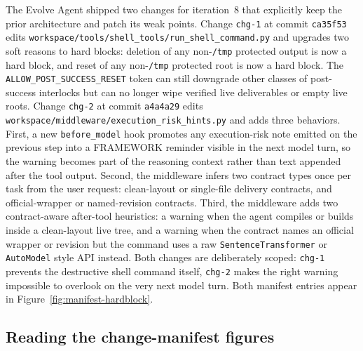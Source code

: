 The Evolve Agent shipped two changes for iteration~8 that explicitly keep the prior architecture and patch its weak points. Change \texttt{chg-1} at commit \texttt{ca35f53} edits \texttt{workspace/tools/shell\_tools/run\_shell\_command.py} and upgrades two soft reasons to hard blocks: deletion of any non-\texttt{/tmp} protected output is now a hard block, and reset of any non-\texttt{/tmp} protected root is now a hard block. The \texttt{ALLOW\_POST\_SUCCESS\_RESET} token can still downgrade other classes of post-success interlocks but can no longer wipe verified live deliverables or empty live roots. Change \texttt{chg-2} at commit \texttt{a4a4a29} edits \texttt{workspace/middleware/execution\_risk\_hints.py} and adds three behaviors. First, a new \texttt{before\_model} hook promotes any execution-risk note emitted on the previous step into a FRAMEWORK reminder visible in the next model turn, so the warning becomes part of the reasoning context rather than text appended after the tool output. Second, the middleware infers two contract types once per task from the user request: clean-layout or single-file delivery contracts, and official-wrapper or named-revision contracts. Third, the middleware adds two contract-aware after-tool heuristics: a warning when the agent compiles or builds inside a clean-layout live tree, and a warning when the contract names an official wrapper or revision but the command uses a raw \texttt{SentenceTransformer} or \texttt{AutoModel} style API instead. Both changes are deliberately scoped: \texttt{chg-1} prevents the destructive shell command itself, \texttt{chg-2} makes the right warning impossible to overlook on the very next model turn. Both manifest entries appear in Figure~\ref{fig:manifest-hardblock}.


\FloatBarrier

\subsection{Reading the change-manifest figures}
\label{app:case-study:manifest}

